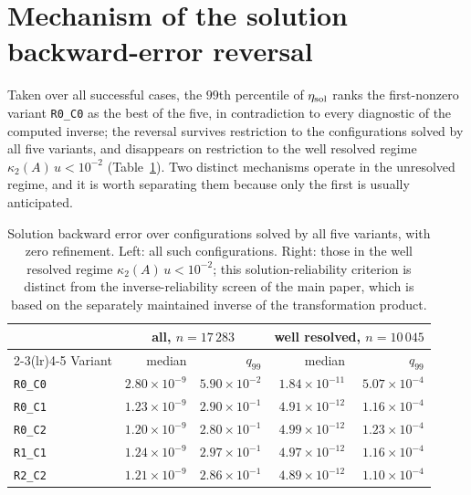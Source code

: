 \documentclass[supplement,review,onefignum,onetabnum]{siamart251216}
\begin{document}
\section{Mechanism of the solution backward-error reversal}
\label{sm:reversal}

Taken over all successful cases, the $99$th percentile of $\eta_{\rm sol}$
ranks the first-nonzero variant \texttt{R0\_C0} as the best of the five,
in contradiction to every diagnostic of the computed inverse; the reversal
survives restriction to the configurations solved by all five variants, and
disappears on restriction to the well resolved regime $\kappa_2(A)\,u<10^{-2}$
(Table~\ref{tab:sm-etasol}). Two distinct mechanisms operate in the unresolved
regime, and it is worth separating them because only the first is usually
anticipated.

\begin{table}
\centering
\caption{Solution backward error over configurations solved by all five
variants, with zero refinement. Left: all such configurations. Right: those in
the well resolved regime $\kappa_2(A)\,u<10^{-2}$; this solution-reliability
criterion is distinct from the inverse-reliability screen of the main paper, which is based on the
separately maintained inverse of the transformation product.}
\label{tab:sm-etasol}
\begin{tabular}{lrrrr}
\hline
& \multicolumn{2}{c}{all, $n=17\,283$} & \multicolumn{2}{c}{well resolved, $n=10\,045$} \\
\cmidrule(lr){2-3}\cmidrule(lr){4-5}
Variant & median & $q_{99}$ & median & $q_{99}$ \\
\hline
\texttt{R0\_C0} & $2.80\times10^{-9}$ & $5.90\times10^{-2}$ & $1.84\times10^{-11}$ & $5.07\times10^{-4}$ \\
\texttt{R0\_C1} & $1.23\times10^{-9}$ & $2.90\times10^{-1}$ & $4.91\times10^{-12}$ & $1.16\times10^{-4}$ \\
\texttt{R0\_C2} & $1.20\times10^{-9}$ & $2.80\times10^{-1}$ & $4.99\times10^{-12}$ & $1.23\times10^{-4}$ \\
\texttt{R1\_C1} & $1.24\times10^{-9}$ & $2.97\times10^{-1}$ & $4.97\times10^{-12}$ & $1.16\times10^{-4}$ \\
\texttt{R2\_C2} & $1.21\times10^{-9}$ & $2.86\times10^{-1}$ & $4.89\times10^{-12}$ & $1.10\times10^{-4}$ \\
\hline
\end{tabular}
\end{table}
\end{document}
